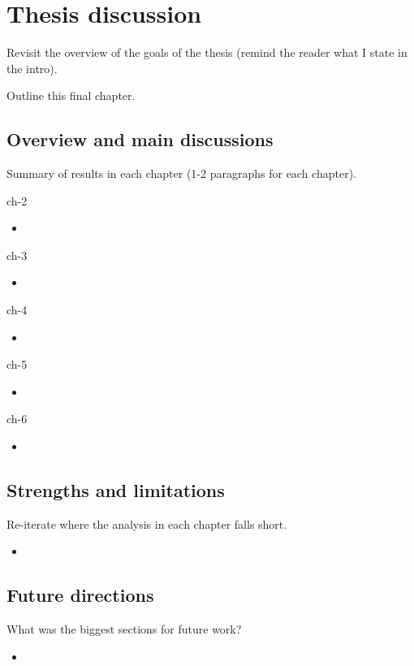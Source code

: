 \chapter{Thesis discussion}\label{chap:chapter7}

Revisit the overview of the goals of the thesis (remind the reader what I state in the intro).

Outline this final chapter.

\section{Overview and main discussions}

Summary of results in each chapter (1-2 paragraphs for each chapter).

ch-2
\begin{itemize}
  \item 
\end{itemize}

ch-3
\begin{itemize}
  \item 
\end{itemize}

ch-4
\begin{itemize}
  \item 
\end{itemize}

ch-5
\begin{itemize}
  \item 
\end{itemize}

ch-6
\begin{itemize}
  \item 
\end{itemize}

\section{Strengths and limitations}

Re-iterate where the analysis in each chapter falls short.
\begin{itemize}
  \item 
\end{itemize}

\section{Future directions}

What was the biggest sections for future work?
\begin{itemize}
  \item 
\end{itemize}

